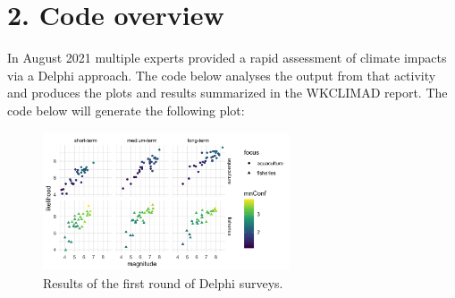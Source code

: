 \documentclass[
]{article}
\begin{document}
\hypertarget{code-overview}{%
\section{2. Code overview}\label{code-overview}}

In August 2021 multiple experts provided a rapid assessment of climate
impacts via a Delphi approach. The code below analyses the output from
that activity and produces the plots and results summarized in the
WKCLIMAD report. The code below will generate the following plot:

\begin{figure}
\centering
\includegraphics[width=0.65\textwidth,height=\textheight]{Figs/Fig1.png}
\caption{Results of the first round of Delphi surveys.}
\end{figure}
\end{document}
